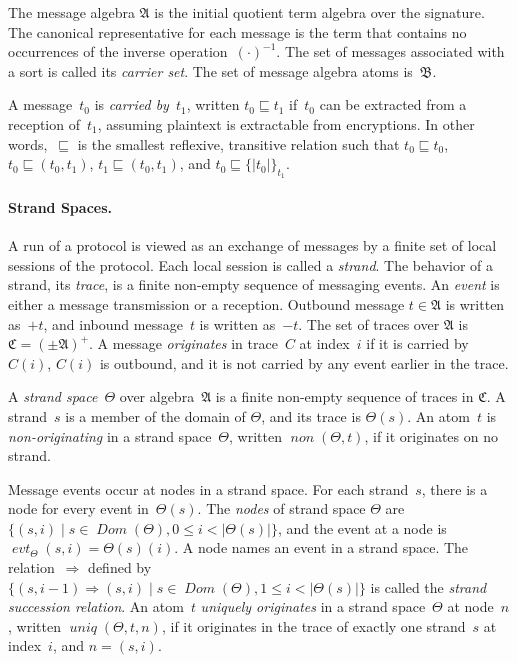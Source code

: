 \documentclass[titlepage,12pt]{article}
\newcommand{\fn}[1]{\ensuremath{\operatorname{\mathit{#1}}}}
\newcommand{\sdom}{\fn{Dom}}
\newcommand{\enc}[2]{\ensuremath{\{\!|#1|\!\}_{#2}}}
\newcommand{\invk}[1]{{#1}^{-1}}
\newcommand{\inbnd}{\mathord -}
\newcommand{\outbnd}{\mathord +}
\newcommand{\alg}[1]{\ensuremath{\mathfrak#1}}
\newcommand{\tr}{\ensuremath{\mathfrak C}}
\newcommand{\evt}{\fn{evt}}
\begin{document}
The message algebra \alg{A} is the initial
quotient term algebra over the signature.  The canonical
representative for each message is the term that contains no
occurrences of the inverse operation~$\invk{(\cdot)}$.  The set of
messages associated with a sort is called its
\emph{carrier set}.  The set of message algebra atoms
is~\alg{B}.

A message~$t_0$ is \emph{carried by}~$t_1$, written
$t_0\sqsubseteq t_1$ if~$t_0$ can be extracted from a reception
of~$t_1$, assuming plaintext is extractable from encryptions.  In
other words,~$\sqsubseteq$ is the smallest reflexive, transitive
relation such that $t_0\sqsubseteq t_0$, $t_0\sqsubseteq (t_0, t_1)$,
$t_1\sqsubseteq (t_0, t_1)$, and $t_0\sqsubseteq\enc{t_0}{t_1}$.

\paragraph{Strand Spaces.}
A run of a protocol is viewed as an exchange of messages by a finite
set of local sessions of the protocol.  Each local session is called a
\emph{strand}.  The behavior of a strand, its
\emph{trace}, is a finite non-empty sequence of messaging
events.  An \emph{event} is either a message transmission
or a reception.  Outbound message $t\in\alg{A}$ is written as~$\outbnd
t$, and inbound message~$t$ is written as~$\inbnd t$.  The set of
traces over $\alg{A}$ is $\tr=(\pm\alg{A})^+$.  A message
\emph{originates} in trace~$C$ at index~$i$ if it is
carried by $C(i)$, $C(i)$ is outbound, and it is not carried by any
event earlier in the trace.

A \emph{strand space}~$\Theta$ over
algebra~$\alg{A}$ is a finite non-empty sequence of traces in $\tr$.
A strand~$s$ is a member of the domain of $\Theta$, and its trace is
$\Theta(s)$.  An atom~$t$ is
\emph{non-originating} in a strand
space~$\Theta$, written \index{non@\fn{non}}$\fn{non}(\Theta,t)$, if it
originates on no strand.

Message events occur at nodes in a strand space.  For each strand~$s$,
there is a node for every event in~$\Theta(s)$.  The
\emph{nodes} of strand space $\Theta$ are $\{(s,i)\mid
s\in\sdom(\Theta), 0\leq i < |\Theta(s)|\}$, and the event at a node
is $\evt_\Theta(s,i)=\Theta(s)(i)$.  A node names an event in a strand
space.  The relation~$\Rightarrow$ defined by
$\{(s,i-1)\Rightarrow(s,i)\mid s\in\sdom(\Theta), 1\leq
i<|\Theta(s)|\}$ is called the \emph{strand
  succession relation}.  An atom~$t$ \emph{uniquely originates} in a strand space~$\Theta$ at
node~$n$, written \index{uniq@\fn{uniq}}$\fn{uniq}(\Theta,t,n)$, if it
originates in the trace of exactly one strand~$s$ at index~$i$, and
$n=(s,i)$.
\end{document}
